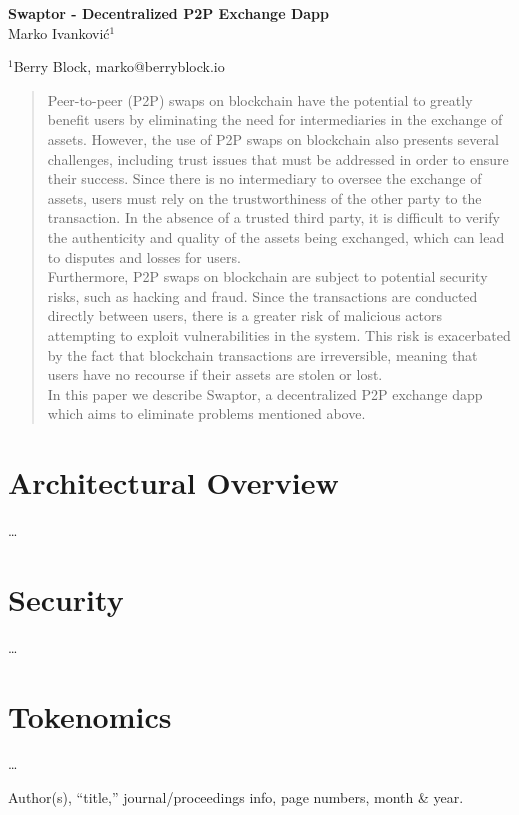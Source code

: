 \documentclass[12pt]{article}
\begin{document}
\baselineskip 12pt

\begin{center}
  \textbf{\Large Swaptor - Decentralized P2P Exchange Dapp} \\

  \vspace{1.5cc}
  { \sc Marko Ivanković$^{1}$}\\

  \vspace{0.3 cm}

  {\small $^{1}$Berry Block, marko@berryblock.io}
\end{center}
\vspace{1.5cc}

\begin{abstract}
  \noindent  Peer-to-peer (P2P) swaps on blockchain have the potential to greatly benefit users by eliminating the need for intermediaries in the exchange of assets. However, the use of P2P swaps on blockchain also presents several challenges, including trust issues that must be addressed in order to ensure their success.  Since there is no intermediary to oversee the exchange of assets, users must rely on the trustworthiness of the other party to the transaction. In the absence of a trusted third party, it is difficult to verify the authenticity and quality of the assets being exchanged, which can lead to disputes and losses for users.
  \\ \indent Furthermore, P2P swaps on blockchain are subject to potential security risks, such as hacking and fraud. Since the transactions are conducted directly between users, there is a greater risk of malicious actors attempting to exploit vulnerabilities in the system. This risk is exacerbated by the fact that blockchain transactions are irreversible, meaning that users have no recourse if their assets are stolen or lost.
  \\ \indent In this paper we describe Swaptor, a decentralized P2P exchange dapp which aims to eliminate problems mentioned above.

  \vspace{0.95cc}
\end{abstract}

\newpage

\tableofcontents

\newpage

\section{Architectural Overview} \label{form}
\dots

\section{Security} \label{subm}
\dots

\section{Tokenomics}
\dots

\begin{thebibliography}{9}
  Author(s), ``title,'' journal/proceedings info, page numbers,
  month \& year.
\end{thebibliography}
\end{document}
